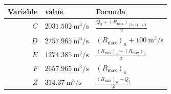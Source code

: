 \begin{tabularx}{\linewidth}{r>{\centering\arraybackslash}X>{\centering\arraybackslash}X}
\toprule  Variable & value & Formula\\\midrule
  $C$ & $\qty{2031.502}{\metre\cubed\per\second}$ & $\frac{Q_3 +  (R_{\max})_{[3n/4] + 1}}{2}$\\\addlinespace
  $D$ & $\qty{2757.965}{\metre\cubed\per\second}$ & $(R_{\max})_n + \qty{100}{\metre\cubed\per\second}$\\\addlinespace
  $E$ & $\qty{1274.385}{\metre\cubed\per\second}$ & $\frac{(R_{\max})_{4} +  (R_{\max})_{5}}{2}$\\\addlinespace
  $F$ & $\qty{2657.965}{\metre\cubed\per\second}$ & $(R_{\max})_n$\\\addlinespace
  $Z$ & $\qty{314.37}{\metre\cubed\per\second}$ & $\frac{(R_{\max})_n - Q_3}{2}$\\\bottomrule
\end{tabularx}